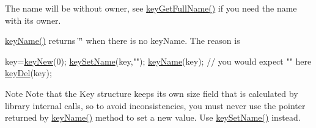 The name will be without owner, see \hyperlink{group__keyname_gaaba1494a5ffc976e0e56c43f4334a23c}{key\-Get\-Full\-Name()} if you need the name with its owner.

\hyperlink{group__keyname_ga8e805c726a60da921d3736cda7813513}{key\-Name()} returns \char`\"{}\char`\"{} when there is no key\-Name. The reason is 
\begin{DoxyCode}
key=\hyperlink{group__key_gaf6893c038b3ebee90c73a9ea8356bebf}{keyNew}(0);
\hyperlink{group__keyname_ga7699091610e7f3f43d2949514a4b35d9}{keySetName}(key,\textcolor{stringliteral}{""});
\hyperlink{group__keyname_ga8e805c726a60da921d3736cda7813513}{keyName}(key); \textcolor{comment}{// you would expect "" here}
\hyperlink{group__key_ga3df95bbc2494e3e6703ece5639be5bb1}{keyDel}(key);
\end{DoxyCode}


\begin{DoxyNote}{Note}
Note that the Key structure keeps its own size field that is calculated by library internal calls, so to avoid inconsistencies, you must never use the pointer returned by \hyperlink{group__keyname_ga8e805c726a60da921d3736cda7813513}{key\-Name()} method to set a new value. Use \hyperlink{group__keyname_ga7699091610e7f3f43d2949514a4b35d9}{key\-Set\-Name()} instead.
\end{DoxyNote}

